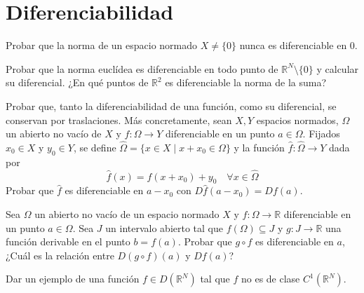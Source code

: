 \section{Diferenciabilidad}

\begin{ejercicio}
Probar que la norma de un espacio normado \( X \neq \{0\} \) nunca es diferenciable en 0.
\end{ejercicio}

\begin{ejercicio}
Probar que la norma euclídea es diferenciable en todo punto de \( \mathbb{R}^N \setminus \{0\} \) y calcular su diferencial. ¿En qué puntos de \( \mathbb{R}^2 \) es diferenciable la norma de la suma?
\end{ejercicio}

\begin{ejercicio}
Probar que, tanto la diferenciabilidad de una función, como su diferencial, se conservan por traslaciones. Más concretamente, sean \( X, Y \) espacios normados, \( \Omega \) un abierto no vacío de \( X \) y \( f : \Omega \rightarrow Y \) diferenciable en un punto \( a \in \Omega \). Fijados \( x_0 \in X \) y \( y_0 \in Y \), se define \( \hat{\Omega} = \{x \in X\mid x + x_0 \in \Omega\} \) y la función \( \hat{f} : \hat{\Omega} \rightarrow Y \) dada por
\[
\hat{f}(x) = f(x + x_0) + y_0 \quad \forall x \in \hat{\Omega}
\]
Probar que \( \hat{f} \) es diferenciable en \( a - x_0 \) con \( D\hat{f}(a - x_0) = Df(a) \).
\end{ejercicio}

\begin{ejercicio}
Sea \( \Omega \) un abierto no vacío de un espacio normado \( X \) y \( f : \Omega \rightarrow \mathbb{R} \) diferenciable en un punto \( a \in \Omega \). Sea \( J \) un intervalo abierto tal que \( f(\Omega) \subseteq J \) y \( g : J \rightarrow \mathbb{R} \) una función derivable en el punto \( b = f(a) \). Probar que \( g \circ f \) es diferenciable en \( a \), ¿Cuál es la relación entre \( D(g \circ f)(a) \) y \( Df(a) \)?
\end{ejercicio}

\begin{ejercicio}
Dar un ejemplo de una función \( f \in D(\mathbb{R}^N) \) tal que \( f \) no es de clase \( C^1(\mathbb{R}^N) \).
\end{ejercicio}
    